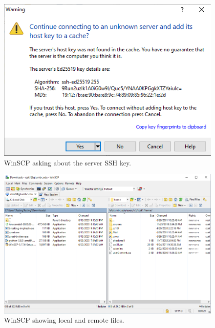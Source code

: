 \documentclass[letter,11pt]{article}
\begin{document}
\begin{figure}
\centering
\includegraphics[scale=0.7]{Images/winscp_connect_first_time.png}
\caption{WinSCP asking about the server SSH key.}
\label{fig:winscpconnectfirsttime}
\end{figure}

\begin{figure}
\centering
\includegraphics[scale=0.6]{Images/winscp_connected.png}
\caption{WinSCP showing local and remote files.}
\label{fig:winscpconnected}
\end{figure}
\end{document}

